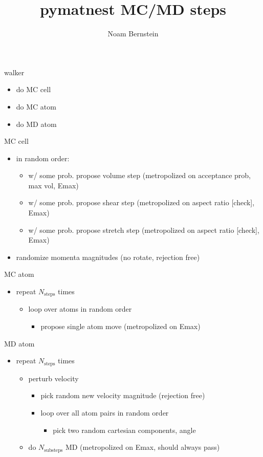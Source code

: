 \documentclass{article}
\title{pymatnest MC/MD steps}
\author{Noam Bernstein}
\begin{document}
\maketitle

walker
\begin{itemize}
   \item do MC cell
   \item do MC atom
   \item do MD atom
\end{itemize}

MC cell
\begin{itemize}
   \item in random order:
   \begin{itemize}
      \item w/ some prob. propose volume step (metropolized on acceptance prob, max vol, Emax)
      \item w/ some prob. propose shear step (metropolized on aspect ratio [check], Emax)
      \item w/ some prob. propose stretch step (metropolized on aspect ratio [check], Emax)
   \end{itemize}
   \item randomize momenta magnitudes (no rotate, rejection free)
\end{itemize}

MC atom
\begin{itemize}
   \item repeat $N_\mathrm{steps}$ times
   \begin{itemize}
      \item loop over atoms in random order
      \begin{itemize}
	 \item propose single atom move (metropolized on Emax)
      \end{itemize}
   \end{itemize}
\end{itemize}

MD atom
\begin{itemize}
   \item repeat $N_\mathrm{steps}$ times
   \begin{itemize}
      \item perturb velocity
      \begin{itemize}
	 \item pick random new velocity magnitude (rejection free)
	 \item loop over all atom pairs in random order
	 \begin{itemize}
	    \item pick two random cartesian components, angle
	 \end{itemize}
      \end{itemize}
      \item do $N_\mathrm{substeps}$ MD (metropolized on Emax, should always pass)
   \end{itemize}
\end{itemize}
\end{document}
